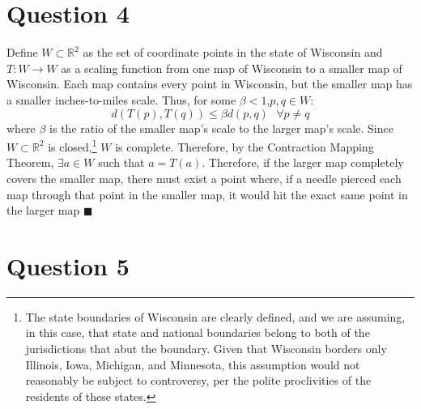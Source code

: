 \documentclass{article}
\newcommand{\R}{\mathbb{R}}
\begin{document}

\section*{Question 4}

Define $W\subset\R^2$ as the set of coordinate points in the state of Wisconsin and $T:W\rightarrow W$ as a scaling function from one map of Wisconsin to a smaller map of Wisconsin. Each map contains every point in Wisconsin, but the smaller map has a smaller inches-to-miles scale. Thus, for some $\beta<1$,$p,q\in W$:
\[
	d(T(p),T(q))\leq\beta d(p,q)\text{  }\forall p\neq q
\]
where $\beta$ is the ratio of the smaller map's scale to the larger map's scale. Since $W\subset\R^2$ is closed,\footnote{The state boundaries of Wisconsin are clearly defined, and we are assuming, in this case, that state and national boundaries belong to both of the jurisdictions that abut the boundary. Given that Wisconsin borders only Illinois, Iowa, Michigan, and Minnesota, this assumption would not reasonably be subject to controversy, per the polite proclivities of the residents of these states.} $W$ is complete. Therefore, by the Contraction Mapping Theorem, $\exists a\in W$ such that $a=T(a)$. Therefore, if the larger map completely covers the smaller map, there must exist a point where, if a needle pierced each map through that point in the smaller map, it would hit the exact same point in the larger map $\blacksquare$




\section*{Question 5}
\end{document}
